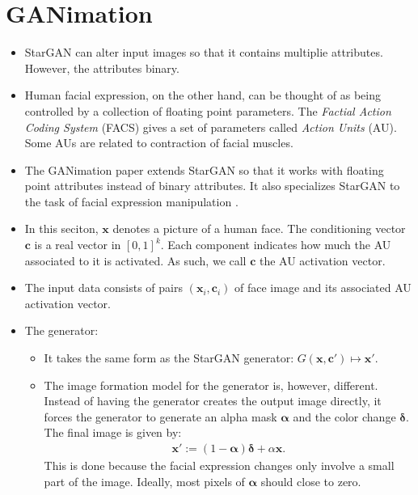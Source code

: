 \documentclass[10pt]{article}
\newcommand{\ve}[1]{\pmb{#1}}
\begin{document}
  \section{GANimation}

  \begin{itemize}
    \item StarGAN can alter input images so that it contains multiplie attributes. However, the attributes binary.

    \item Human facial expression, on the other hand, can be thought of as being controlled by a collection of floating point parameters. The \emph{Factial Action Coding System} (FACS) gives a set of parameters called \emph{Action Units} (AU). Some AUs are related to contraction of facial muscles.

    \item The GANimation paper extends StarGAN so that it works with floating point attributes instead of binary attributes. It also specializes StarGAN to the task of facial expression manipulation \cite{Pumarola:2018}.

    \item In this seciton, $\ve{x}$ denotes a picture of a human face. The conditioning vector $\ve{c}$ is a real vector in $[0,1]^k$. Each component indicates how much the AU associated to it is activated. As such, we call $\ve{c}$ the AU activation vector.

    \item The input data consists of pairs $(\ve{x}_i, \ve{c}_i)$ of face image and its associated AU activation vector.

    \item The generator:
    \begin{itemize}
      \item It takes the same form as the StarGAN generator: $G(\ve{x}, \ve{c}') \mapsto \ve{x}'.$

      \item The image formation model for the generator is, however, different. Instead of having the generator creates the output image directly, it forces the generator to generate an alpha mask $\ve{\alpha}$ and the color change $\ve{\delta}$. The final image is given by:
      \begin{align*}
        \ve{x}' := (1 - \ve{\alpha}) \ve{\delta} + \alpha \ve{x}.
      \end{align*}
      This is done because the facial expression changes only involve a small part of the image. Ideally, most pixels of $\ve{\alpha}$ should close to zero.      
    \end{itemize}


\end{itemize}
\end{document}
